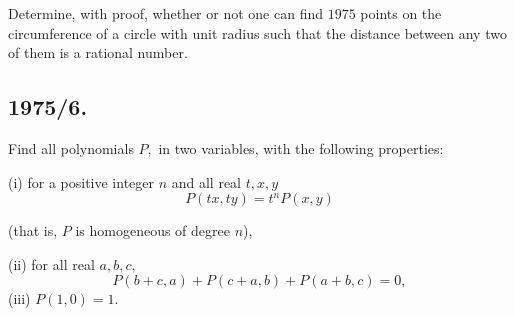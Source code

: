 \documentclass[12pt,thmsa]{article}
\begin{document}
Determine, with proof, whether or not one can find $1975$ points on the
circumference of a circle with unit radius such that the distance between
any two of them is a rational number.

\subsection{1975/6. }

Find all polynomials $P,$ in two variables, with the following properties:

(i) for a positive integer $n$ and all real $t,x,y$%
\[
P(tx,ty)=t^{n}P(x,y)
\]

(that is, $P$ is homogeneous of degree $n$),

(ii) for all real $a,b,c,$%
\[
P(b+c,a)+P(c+a,b)+P(a+b,c)=0,
\]
(iii) $P(1,0)=1.$
\end{document}
